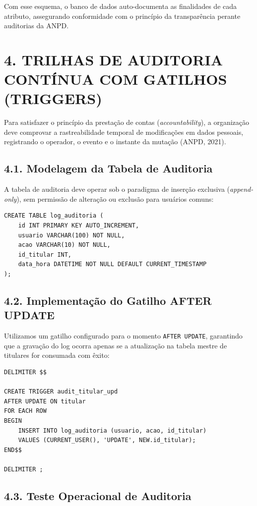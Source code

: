 Com esse esquema, o banco de dados auto-documenta as finalidades de cada atributo, assegurando conformidade com o princípio da transparência perante auditorias da ANPD.

\newpage

\section*{4. TRILHAS DE AUDITORIA CONTÍNUA COM GATILHOS (TRIGGERS)}

Para satisfazer o princípio da prestação de contas (\textit{accountability}), a organização deve comprovar a rastreabilidade temporal de modificações em dados pessoais, registrando o operador, o evento e o instante da mutação (ANPD, 2021).

\subsection*{4.1. Modelagem da Tabela de Auditoria}

A tabela de auditoria deve operar sob o paradigma de inserção exclusiva (\textit{append-only}), sem permissão de alteração ou exclusão para usuários comuns:

\begin{lstlisting}
CREATE TABLE log_auditoria (
    id INT PRIMARY KEY AUTO_INCREMENT,
    usuario VARCHAR(100) NOT NULL,
    acao VARCHAR(10) NOT NULL,
    id_titular INT,
    data_hora DATETIME NOT NULL DEFAULT CURRENT_TIMESTAMP
);
\end{lstlisting}

\subsection*{4.2. Implementação do Gatilho AFTER UPDATE}

Utilizamos um gatilho configurado para o momento \texttt{AFTER UPDATE}, garantindo que a gravação do log ocorra apenas se a atualização na tabela mestre de titulares for consumada com êxito:

\begin{lstlisting}
DELIMITER $$

CREATE TRIGGER audit_titular_upd
AFTER UPDATE ON titular
FOR EACH ROW
BEGIN
    INSERT INTO log_auditoria (usuario, acao, id_titular)
    VALUES (CURRENT_USER(), 'UPDATE', NEW.id_titular);
END$$

DELIMITER ;
\end{lstlisting}

\subsection*{4.3. Teste Operacional de Auditoria}

